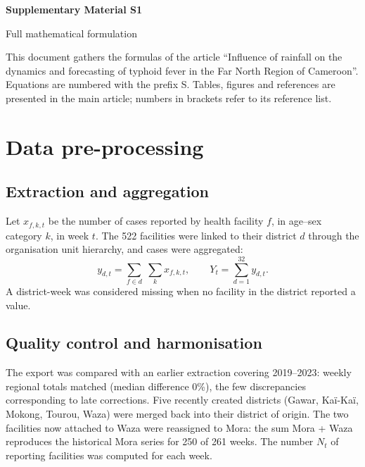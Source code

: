 \documentclass[11pt]{article}
\begin{document}
\sloppy
\thispagestyle{fancy}
\par\vspace{2pt}
\noindent{\color{navy}\rule{\linewidth}{1.2pt}}\par\vspace{8pt}
{\raggedright\sffamily\bfseries\LARGE\color{navy}Supplementary Material S1\par}\vspace{4pt}
{\raggedright\sffamily\large\color{navy}Full mathematical formulation\par}\vspace{10pt}
\noindent This document gathers the formulas of the article “Influence of rainfall on the dynamics and forecasting of typhoid fever in the Far North Region of Cameroon”. Equations are numbered with the prefix S. Tables, figures and references are presented in the main article; numbers in brackets refer to its reference list.
\section{Data pre-processing}


\subsection{Extraction and aggregation}
Let $x_{f,k,t}$ be the number of cases reported by health facility $f$, in age–sex category $k$, in week $t$. The 522 facilities were linked to their district $d$ through the organisation unit hierarchy, and cases were aggregated:
\begin{equation}
y_{d,t}=\sum_{f\in d}\;\sum_{k} x_{f,k,t}, \qquad Y_t=\sum_{d=1}^{32} y_{d,t}.
\label{eq:agg}
\end{equation}
A district-week was considered missing when no facility in the district reported a value.

\subsection{Quality control and harmonisation}
The export was compared with an earlier extraction covering 2019–2023: weekly regional totals matched (median difference 0\%), the few discrepancies corresponding to late corrections. Five recently created districts (Gawar, Kaï-Kaï, Mokong, Tourou, Waza) were merged back into their district of origin. The two facilities now attached to Waza were reassigned to Mora: the sum Mora + Waza reproduces the historical Mora series for 250 of 261 weeks. The number $N_t$ of reporting facilities was computed for each week.
\end{document}
